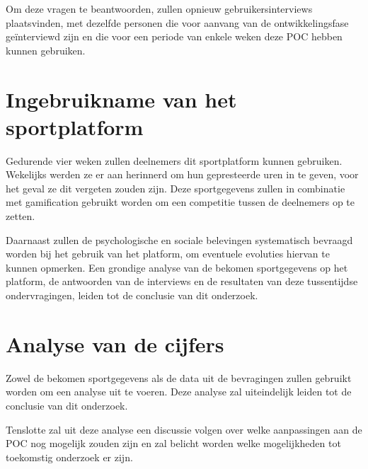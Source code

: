 Om deze vragen te beantwoorden, zullen opnieuw gebruikersinterviews plaatsvinden, met dezelfde personen die voor aanvang van de ontwikkelingsfase geïnterviewd zijn en die voor een periode van enkele weken deze POC hebben kunnen gebruiken.

\section{Ingebruikname van het sportplatform}

Gedurende vier weken zullen deelnemers dit sportplatform kunnen gebruiken. Wekelijks werden ze er aan herinnerd om hun gepresteerde uren in te geven, voor het geval ze dit vergeten zouden zijn. Deze sportgegevens zullen in combinatie met gamification gebruikt worden om een competitie tussen de deelnemers op te zetten.

Daarnaast zullen de psychologische en sociale belevingen systematisch bevraagd worden bij het gebruik van het platform, om eventuele evoluties hiervan te kunnen opmerken. Een grondige analyse van de bekomen sportgegevens op het platform, de antwoorden van de interviews en de resultaten van deze tussentijdse ondervragingen, leiden tot de conclusie van dit onderzoek.

\section{Analyse van de cijfers}

Zowel de bekomen sportgegevens als de data uit de bevragingen zullen gebruikt worden om een analyse uit te voeren. Deze analyse zal uiteindelijk leiden tot de conclusie van dit onderzoek.

Tenslotte zal uit deze analyse een discussie volgen over welke aanpassingen aan de POC nog mogelijk zouden zijn en zal belicht worden welke mogelijkheden tot toekomstig onderzoek er zijn.




